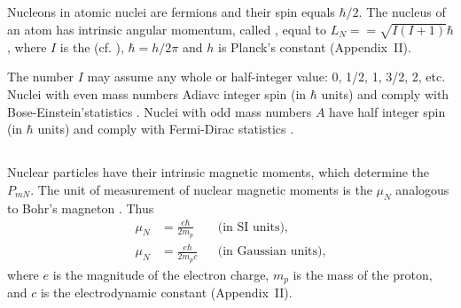 \subsection{}\label{42.1.5} Nucleons in atomic nuclei are fermions  and their spin equals $\hbar /2$. The nucleus of an atom has intrinsic angular momentum, called , equal to $L_{N} =
= \sqrt{ I(I+1)} \hbar$, where $I$ is the  (cf. ), $\hbar = h/2 \pi$ and $h$ is Planck's constant (Appendix~II). 

The number $I$ may assume any whole or half-integer value:
0, 1/2, 1, 3/2, 2, etc. Nuclei with even mass numbers Adiavc
integer spin (in $\hbar$ units) and comply with Bose-Einstein'statistics . Nuclei with odd mass numbers $A$ have half integer spin (in $\hbar$ units) and comply with Fermi-Dirac statistics .

\subsection{}\label{42.1.6}


Nuclear particles have their intrinsic magnetic moments,
which determine the  $P_{mN}$. The unit of measurement of nuclear magnetic moments is the  $\mu_{N}$ analogous to Bohr's magneton . Thus
\begin{align*}%
\mu_{N} & = \frac{e \hbar}{2 m_{p}} && \text{(in SI units),}\\
\mu_{N} & = \frac{e \hbar}{2 m_{p}c} && \text{(in Gaussian units),}
\end{align*}
where $e$ is the magnitude of the electron charge, $m_{p}$ is the mass of the proton, and $c$ is the electrodynamic constant (Appendix~II).

